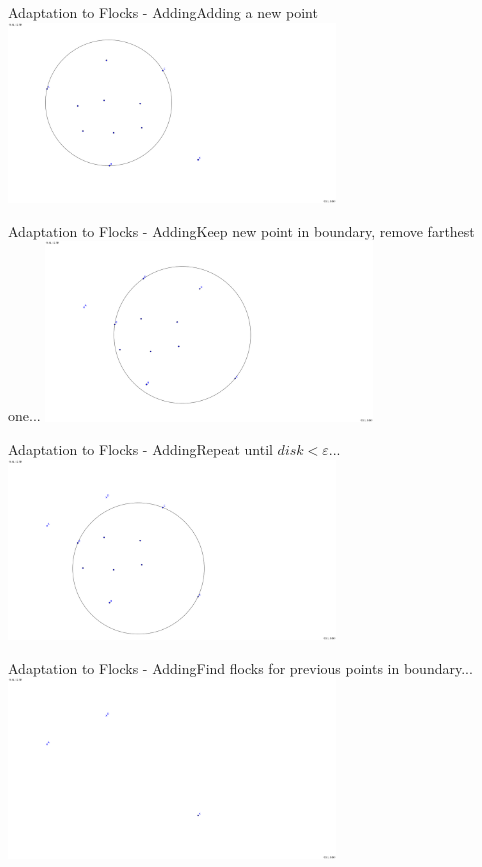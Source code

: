 \documentclass{beamer}
\begin{document}
\begin{frame}{Adaptation to Flocks - Adding}{Adding a new point}
    \centering
    \includegraphics[trim=2cm 0 8cm 0,clip,width=0.65\textwidth]{figures/F01} 
\end{frame}
\begin{frame}{Adaptation to Flocks - Adding}{Keep new point in boundary, remove farthest one...}
    \centering
    \includegraphics[trim=2cm 0 8cm 0,clip,width=0.65\textwidth]{figures/F02} 
\end{frame}
\begin{frame}{Adaptation to Flocks - Adding}{Repeat until $disk < \varepsilon$...}
    \centering
    \includegraphics[trim=2cm 0 8cm 0,clip,width=0.65\textwidth]{figures/F03} 
\end{frame}
\begin{frame}{Adaptation to Flocks - Adding}{Find flocks for previous points in boundary...}
    \centering
    \includegraphics[trim=2cm 0 8cm 0,clip,width=0.65\textwidth]{figures/F04} 
\end{frame}
\end{document}
